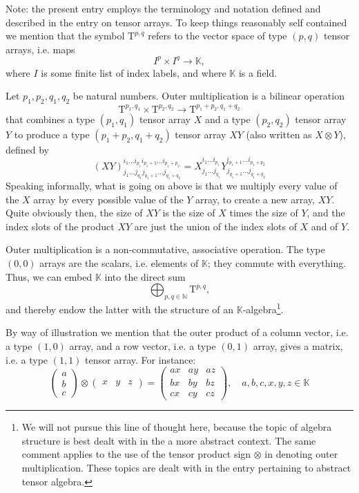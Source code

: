 \documentclass[12pt]{article}
\newcommand{\natnums}{\mathbb{N}}
\newcommand{\kfield}{\mathbb{K}}
\newcommand{\rT}{\mathrm{T}}
\newcommand{\tspace}[1]{\rT^{#1}}
\begin{document}
Note: the present entry employs the terminology and notation defined
and described in the entry on tensor arrays.  To keep things
reasonably self contained we mention that the symbol $\tspace{p,q}$ refers
to the vector space of type $(p,q)$ tensor arrays, i.e. maps
$$I^p\times I^q\rightarrow \kfield,$$
where $I$ is some finite list of
index labels, and where $\kfield$ is a field.


Let $p_1,p_2,q_1,q_2$ be natural numbers.  Outer multiplication is a
bilinear operation
$$\tspace{p_1,q_1} \times \tspace{p_2,q_2} \rightarrow
\tspace{p_1+p_2,q_1+q_2}$$
that combines a type $(p_1,q_1)$
tensor array $X$ and a type $(p_2,q_2)$ tensor array $Y$ to
produce a type $(p_1+p_2,q_1+q_2)$ tensor array $XY$ (also
written as $X\otimes Y$), defined by
$$
(XY)^{i_1\ldots i_{p_1} i_{p_1+1} \ldots i_{p_1+p_2}}_{j_1\ldots
    j_{q_1} j_{q_1+1} \ldots j_{q_1+q_2} }
=
X^{i_1\ldots i_{p_1}}_{j_1\ldots j_{q_1}}
Y^{i_{p_1+1}\ldots i_{p_1+p_2}}_{j_{q_1+1}\ldots j_{q_1+q_2}}
$$
Speaking informally, what is going on above is that we multiply
every value of the $X$ array by every possible value of the $Y$ array,
to create a new array, $XY$. Quite obviously then, the size of $XY$ is
the size of $X$ times the size of $Y$, and the index slots of the
product $XY$ are just the union of the index slots of $X$ and of $Y$.

Outer multiplication is a non-commutative, associative operation.  The
type $(0,0)$ arrays are the scalars, i.e. elements of
$\kfield$; they commute with everything. Thus, we can embed $\kfield$ into
the direct sum
$$\bigoplus_{p,q\in\natnums} \tspace{p,q},$$
and thereby endow the latter
with the structure of an $\kfield$-algebra\footnote{We will not pursue this
line of thought here, because the topic of algebra structure is best
dealt with in the a more abstract context.  The same comment applies
to the use of the tensor product sign $\otimes$ in denoting outer
multiplication.  These topics are dealt with in the entry pertaining
to abstract tensor algebra.}.

By way of illustration we mention that the outer product of a column
vector, i.e. a type $(1,0)$ array, and a row vector, i.e. a type
$(0,1)$ array, gives a matrix, i.e. a type $(1,1)$
tensor array.  For instance:
$$
\begin{pmatrix}
a \\ b \\ c
\end{pmatrix}\otimes
\begin{pmatrix}
x & y & z 
\end{pmatrix} 
= 
\begin{pmatrix}
ax & ay & az \\
bx & by & bz \\
cx & cy & cz
\end{pmatrix}
,\quad
a,b,c,x,y,z\in \kfield
$$
\end{document}
